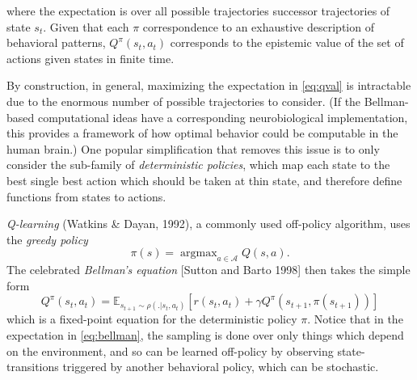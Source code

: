 \documentclass{article} %
\DeclareMathOperator{\argmax}{argmax}
\begin{document}
where the expectation is over all possible trajectories successor
trajectories of state $s_t$.
Given that each $\pi$ correspondence to an exhaustive description of
behavioral patterns, $Q^{\pi}(s_t,a_t)$ corresponds to the epistemic value of
the set of actions given states in finite time.


By construction, in general, maximizing the expectation in  \eqref{eq:qval} is intractable due to
the enormous number of possible trajectories to consider.
(If the Bellman-based computational ideas have a corresponding
neurobiological implementation, this provides a framework of how
optimal behavior could be computable in the human brain.)
One popular simplification that removes this issue is to only consider the sub-family of
\textit{deterministic policies}, which map each state to the best single best action which
should be taken at thin state, and therefore define functions from states to actions.

\textit{Q-learning} (Watkins \& Dayan, 1992), a commonly used off-policy algorithm, uses the
\textit{greedy policy}
\begin{equation}
  \pi(s) = \argmax_{a \in \mathcal A}{Q}(s, a).
  \label{eq:qlearning}
\end{equation}
The celebrated \textit{Bellman's equation} [Sutton and Barto 1998] then takes the simple form
\begin{equation}
  Q^\pi(s_t, a_t) = \mathbb E_{s_{t+1} \sim \rho(.|s_t,a_t)} [r(s_t,a_t) + \gamma Q^\pi(s_{t+1}, \pi(s_{t+1}))]
  \label{eq:bellman}
\end{equation}
which is a fixed-point equation for the deterministic policy $\pi$.
Notice that in the expectation in \eqref{eq:bellman}, the sampling is done over only things which
depend on the environment, and so can be learned off-policy by observing state-transitions
triggered by another behavioral policy, which can be stochastic.
\end{document}
